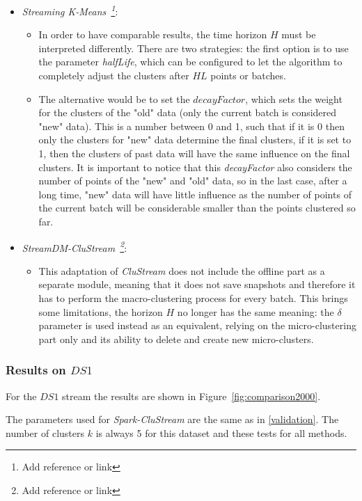\begin{itemize}
 \item \textit{Streaming K-Means~\footnote{Add reference or link}}:
 \begin{itemize}
  \item In order to have comparable results, the time horizon $H$ must be interpreted differently. There are two strategies: the first option is to use the parameter \textit{halfLife}, which can be configured to let the algorithm to completely adjust the clusters after $HL$ points or batches.
  \item The alternative would be to set the $decayFactor$, which sets the weight for the clusters of the "old" data (only the current batch is considered "new" data). This is a number between 0 and 1, such that if it is 0 then only the clusters for "new" data determine the final clusters, if it is set to 1, then the clusters of past data will have the same influence on the final clusters. It is important to notice that this \textit{decayFactor} also considers the number of points of the "new" and "old" data, so in the last case, after a long time, "new" data will have little influence as the number of points of the current batch will be considerable smaller than the points clustered so far.
 \end{itemize}
 \item \textit{StreamDM-CluStream~\footnote{Add reference or link}}:
 \begin{itemize}
  \item This adaptation of \textit{CluStream} does not include the offline part as a separate module, meaning that it does not save snapshots and therefore it has to perform the macro-clustering process for every batch. This brings some limitations, the horizon $H$ no longer has the same meaning: the $\delta$ parameter is used instead as an equivalent, relying on the micro-clustering part only and its ability to delete and create new micro-clusters.
\end{itemize}

\end{itemize}

\subsubsection{Results on $DS1$}
For the $DS1$ stream the results are shown in Figure~\ref{fig:comparison2000}.

The parameters used for \textit{Spark-CluStream} are the same as in \ref{validation}. The number of clusters $k$ is always 5 for this dataset and these tests for all methods.

